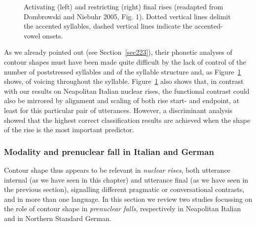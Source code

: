 \begin{figure}
\centering
{}
\caption{Activating (left) and restricting (right) final rises (readapted from Dombrowski and Niebuhr 2005, Fig. 1). Dotted vertical lines delimit the accented syllables, dashed vertical lines indicate the accented-vowel onsets.}
\label{fig209}\end{figure}

As we already pointed out (see Section~\ref{sec223}), their phonetic analyses of contour shapes must have been made quite difficult by the lack of control of the number of poststressed syllables and of the syllable structure and, as Figure~\ref{fig209} shows, of voicing throughout the syllable. Figure~\ref{fig209} also shows that, in contrast with our results on Neapolitan Italian nuclear rises, the functional contrast could also be mirrored by alignment and scaling of both rise start- and endpoint, at least for this particular pair of utterances. However, a discriminant analysis showed that the highest correct classification results are achieved when the shape of the rise is the most important predictor.

\subsubsection{Modality and prenuclear fall in Italian and German}\label{sec2412}
Contour shape thus appears to be relevant in \textit{nuclear rises}, both utterance internal (as we have seen in this chapter) and utterance final (as we have seen in the previous section), signalling different pragmatic or conversational contrasts, and in more than one language. In this section we review two studies focussing on the role of contour shape in \textit{prenuclear falls}, respectively in Neapolitan Italian and in Northern Standard German.

